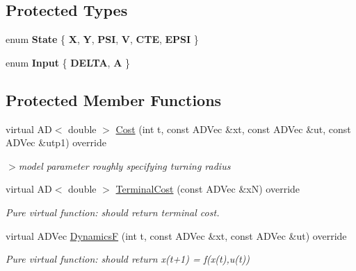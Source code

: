 \subsection*{Protected Types}
\begin{DoxyCompactItemize}
\item 
\mbox{\label{classBikeModel_a794e1e8dcf6d5e58803d851ca097dc63}} 
enum {\bfseries State} \{ \newline
{\bfseries X}, 
{\bfseries Y}, 
{\bfseries P\+SI}, 
{\bfseries V}, 
\newline
{\bfseries C\+TE}, 
{\bfseries E\+P\+SI}
 \}
\item 
\mbox{\label{classBikeModel_a9b8c73f626805ae449dac8cc614dd6ec}} 
enum {\bfseries Input} \{ {\bfseries D\+E\+L\+TA}, 
{\bfseries A}
 \}
\end{DoxyCompactItemize}
\subsection*{Protected Member Functions}
\begin{DoxyCompactItemize}
\item 
\mbox{\label{classBikeModel_a5e1e33879d7c1d78114698fede96644b}} 
virtual AD$<$ double $>$ \mbox{\hyperlink{classBikeModel_a5e1e33879d7c1d78114698fede96644b}{Cost}} (int t, const A\+D\+Vec \&xt, const A\+D\+Vec \&ut, const A\+D\+Vec \&utp1) override
\begin{DoxyCompactList}\small\item\em $>$model parameter roughly specifying turning radius \end{DoxyCompactList}\item 
\mbox{\label{classBikeModel_a41e34fb81b1be3b7fc83f38ddba6e27a}} 
virtual AD$<$ double $>$ \mbox{\hyperlink{classBikeModel_a41e34fb81b1be3b7fc83f38ddba6e27a}{Terminal\+Cost}} (const A\+D\+Vec \&xN) override
\begin{DoxyCompactList}\small\item\em Pure virtual function\+: should return terminal cost. \end{DoxyCompactList}\item 
\mbox{\label{classBikeModel_a501b47d01bda90c2d6ce7392acb7224e}} 
virtual A\+D\+Vec \mbox{\hyperlink{classBikeModel_a501b47d01bda90c2d6ce7392acb7224e}{DynamicsF}} (int t, const A\+D\+Vec \&xt, const A\+D\+Vec \&ut) override
\begin{DoxyCompactList}\small\item\em Pure virtual function\+: should return x(t+1) = f(x(t),u(t)) \end{DoxyCompactList}\end{DoxyCompactItemize}
